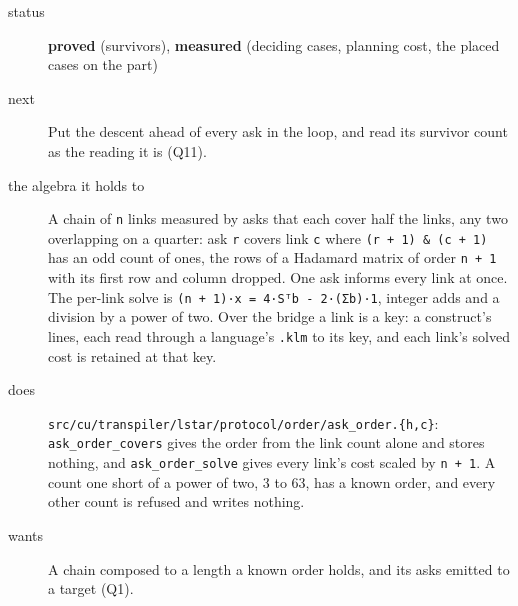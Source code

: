 \begin{description}
\item[{status}] \textbf{proved} (survivors), \textbf{measured} (deciding cases, planning cost, the placed cases on the part)
\item[{next}] Put the descent ahead of every ask in the loop, and read its survivor count as the reading it is (Q11).
\end{description}

\begin{description}
\item[{the algebra it holds to}] A chain of \texttt{n} links measured by asks that each cover half the links, any two overlapping on a quarter: ask \texttt{r} covers link \texttt{c} where \texttt{(r + 1) \& (c + 1)} has an odd count of ones, the rows of a Hadamard matrix of order \texttt{n + 1} with its first row and column dropped. One ask informs every link at once. The per-link solve is \texttt{(n + 1)·x = 4·Sᵀb -\allowbreak{} 2·(Σb)·1}, integer adds and a division by a power of two. Over the bridge a link is a key: a construct's lines, each read through a language's \texttt{.\allowbreak{}klm} to its key, and each link's solved cost is retained at that key.
\item[{does}] \texttt{src/\allowbreak{}cu/\allowbreak{}transpiler/\allowbreak{}lstar/\allowbreak{}protocol/\allowbreak{}order/\allowbreak{}ask\_\allowbreak{}order.\allowbreak{}\{h,c\}}: \texttt{ask\_\allowbreak{}order\_\allowbreak{}covers} gives the order from the link count alone and stores nothing, and \texttt{ask\_\allowbreak{}order\_\allowbreak{}solve} gives every link's cost scaled by \texttt{n + 1}. A count one short of a power of two, 3 to 63, has a known order, and every other count is refused and writes nothing.
\item[{wants}] A chain composed to a length a known order holds, and its asks emitted to a target (Q1).

\end{description}
